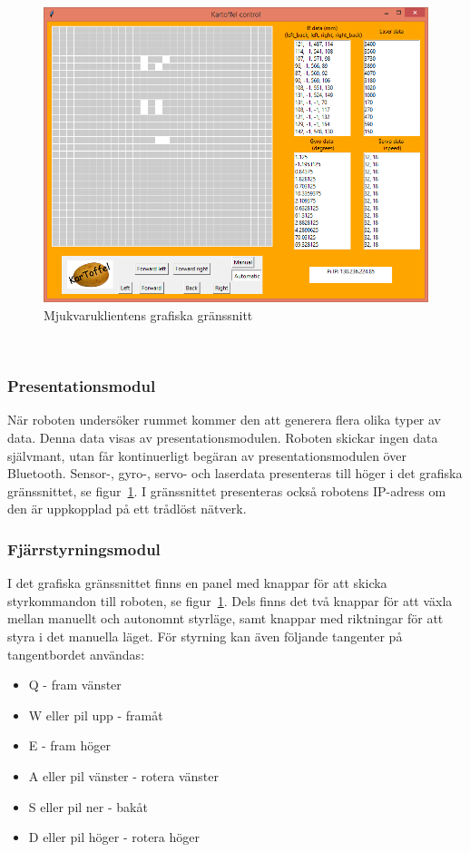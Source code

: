 \documentclass{article}
\begin{document}
\begin{figure}[H]
\centering
\includegraphics[scale=0.55]{client_interface}
\caption{Mjukvaruklientens grafiska gränssnitt}
\label{fig:client_interface}
\end{figure}
\ \\
\subsubsection{Presentationsmodul}
När roboten undersöker rummet kommer den att generera flera olika typer av data. Denna data visas av presentationsmodulen. Roboten skickar ingen data självmant, utan får kontinuerligt begäran av presentationsmodulen över Bluetooth. Sensor-, gyro-, servo- och laserdata presenteras till höger i det grafiska gränssnittet, se figur~\ref{fig:client_interface}. I gränssnittet presenteras också robotens IP-adress om den är uppkopplad på ett trådlöst nätverk.

\subsubsection{Fjärrstyrningsmodul}
I det grafiska gränssnittet finns en panel med knappar för att skicka styrkommandon till roboten, se figur~\ref{fig:client_interface}. Dels finns det två knappar för att växla mellan manuellt och autonomnt styrläge, samt knappar med riktningar för att styra i det manuella läget. För styrning kan även följande tangenter på tangentbordet användas:
\begin{itemize}
    \item Q - fram vänster
    \item W eller pil upp - framåt
    \item E - fram höger
    \item A eller pil vänster - rotera vänster
    \item S eller pil ner - bakåt
    \item D eller pil höger - rotera höger
\end{itemize}
\end{document}
